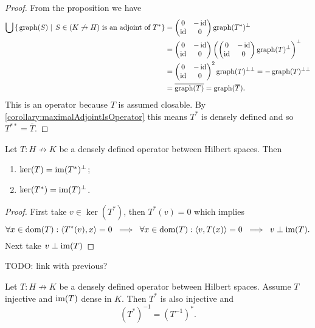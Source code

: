 \begin{proof}
From the proposition we have
\begin{align*}
\bigcup\left\{\left. \operatorname{graph}(S) \;\right|\; \text{$S\in (K\not\to H)$ is an adjoint of $T^*$} \right\} &=  \begin{pmatrix}
0 & -\operatorname{id} \\ \operatorname{id} & 0
\end{pmatrix}\operatorname{graph}(T^*)^\perp \\
&=  \begin{pmatrix}
0 & -\operatorname{id} \\ \operatorname{id} & 0
\end{pmatrix}\left(\begin{pmatrix}
0 & -\operatorname{id} \\ \operatorname{id} & 0
\end{pmatrix}\operatorname{graph}(T)^\perp\right)^\perp \\
&= \begin{pmatrix}
0 & -\operatorname{id} \\ \operatorname{id} & 0
\end{pmatrix}^2\operatorname{graph}(T)^{\perp\perp} = -\operatorname{graph}(T)^{\perp\perp} \\
&= \overline{\operatorname{graph}(T)} = \operatorname{graph}(\overline{T}).
\end{align*}
This is an operator because $T$ is assumed closable. By \ref{corollary:maximalAdjointIsOperator} this means $T^*$ is densely defined and so $T^{**} = \overline{T}$.
\end{proof}

\begin{proposition} \label{prop:kernelImageAdjoint}
Let $T: H\not\to K$ be a densely defined operator between Hilbert spaces. Then
\begin{enumerate}
\item $\ker(T) = \operatorname{im}(T^*)^\perp$;
\item $\ker(T^*) = \operatorname{im}(T)^\perp$.
\end{enumerate}
\end{proposition}
\begin{proof}
First take $v\in \ker(T^*)$, then $T^*(v) = 0$ which implies
\[ \forall x \in\operatorname{dom}(T): \left\langle T^*(v), x \right\rangle = 0 \;\implies\; \forall x \in\operatorname{dom}(T): \left\langle v, T(x) \right\rangle = 0 \;\implies\; v\perp \operatorname{im}(T).  \]
Next take $v\perp \operatorname{im}(T)$
\end{proof}
TODO: link with previous?

\begin{lemma}
Let $T: H\not\to K$ be a densely defined operator between Hilbert spaces. Assume $T$ injective and $\operatorname{im}(T)$ dense in $K$. Then $T^*$ is also injective and
\[ (T^*)^{-1} = (T^{-1})^*. \]
\end{lemma}

